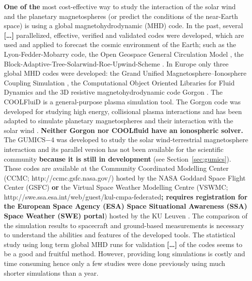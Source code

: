 \documentclass[linenumbers,draft]{agujournal}
\begin{document}
\textbf{One of the} most cost-effective way to study the interaction of the solar wind and the planetary magnetospheres (or predict the conditions of the near-Earth space) is using a global magnetohydrodynamic (MHD) code. In the past, several \textbf{[\dots]} parallelized, effective, verified and validated codes were developed, which are used and applied to forecast the cosmic environment of the Earth; such as the Lyon-Fedder-Mobarry \citep[LFM;][]{lyon04:_lyon_fedder_mobar_lfm_mhd} code, the Open Geospace General Circulation Model \citep[OpenGGCM;][]{raeder08:_openg_simul_themis_mission}, the Block-Adaptive-Tree-Solarwind-Roe-Upwind-Scheme \citep[BATS-R-US;][]{powell99:_solut_adapt_upwin_schem_ideal_magnet,toth12:_adapt}. In Europe only three global MHD codes were developed: the Grand Unified Magnetosphere--Ionosphere Coupling Simulation \citep[GUMICS$-$4;][]{janhunen12:_gumic_mhd}, the Computational Object Oriented Libraries for Fluid Dynamics \citep[COOLFluiD;][]{lani12:_coolf_open_comput_platf_aerot} and the 3D resistive magnetohydrodynamic code Gorgon \citep{chittenden04:_x_z,ciardi07}. The COOLFluiD is a general-purpose plasma simulation tool. The Gorgon code was developed for studying high energy, collisional plasma interactions and has been adapted to simulate planetary magnetospheres and their interaction with the solar wind \citep{mejnertsen16:_global_mhd_neptun,mejnertsen18:_global_mhd_simul_earth_bow}. \textbf{Neither Gorgon nor COOLfluid have an ionospheric solver.} The GUMICS$-$4 was developed to study the solar wind-terrestrial magnetosphere interaction and its parallel version has not been available for the scientific community \textbf{because it is still in development} (see Section~\ref{sec:gumics}). These codes are available at the Community Coordinated Modelling Center (CCMC; http://ccmc.gsfc.nasa.gov/) hosted by the NASA Goddard Space Flight Center (GSFC) \textbf{or} the Virtual Space Weather Modelling Centre (VSWMC; http://swe.ssa.esa.int/web/guest/kul-cmpa-federated\textbf{; requires registration for the European Space Agency (ESA) Space Situational Awareness (SSA) Space Weather (SWE) portal}) hosted by the KU Leuven \citep{poedts20:_virtual_space_weath_model_centr}. The comparison of the simulation results to spacecraft and ground-based measurements is necessary to understand the abilities and features of the developed tools. The statistical study using long term global MHD runs for validation \textbf{[\dots]} of the codes seems to be a good and fruitful method. However, providing long simulations is costly and time consuming hence only a few studies were done previously using much shorter simulations than a year. 
\end{document}
